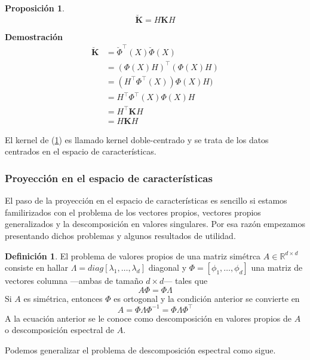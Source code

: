 \documentclass{article}
\numberwithin{equation}{section}
\newtheorem{proposition}{Proposición}
\theoremstyle{remark}
\theoremstyle{definition}
\newtheorem{definition}{Definición}
\theoremstyle{remark}
\theoremstyle{remark}
\begin{document}
\begin{proposition}
   \label{pp:double_centered_kernel}
   $$\breve{\bm{K}} = H \bm{K} H$$
\end{proposition}
\textbf{Demostración}
\begin{align*}
\breve{\bm{K}} &= \breve{\Phi}^\intercal(X) \breve{\Phi}(X) \\
        &= (\Phi(X)H)^\intercal (\Phi(X)H) \\
        &= (H^\intercal \Phi^\intercal(X))\Phi(X)H) \\
        &= H^\intercal \Phi^\intercal(X)\Phi(X)H \\
        &= H^\intercal \bm{K} H \\
        &= H \bm{K} H
\end{align*}

El kernel de (\ref{pp:double_centered_kernel}) es llamado kernel doble-centrado y se trata
de los datos centrados en el espacio de características.

\subsubsection{Proyección en el espacio de características}
El paso de la proyección en el espacio de características es sencillo si 
estamos familirizados con el problema de los vectores propios, vectores propios generalizados y 
la descomposición en valores singulares.
Por esa razón empezamos presentando dichos problemas y algunos resultados de utilidad.

\begin{definition}
    \label{df:eigenvalue_problem}
    El problema de valores propios de una matriz simétrca $A \in \mathbb{R}^{d \times d}$ consiste en hallar
    $\Lambda = diag[\lambda_1, \ldots, \lambda_d]$ diagonal y $\Phi = [\phi_1, \ldots, \phi_d]$ 
    una matriz de vectores columna ---ambas de tamaño $d \times d$--- tales que
    $$A \Phi = \Phi \Lambda$$
    Si $A$ es simétrica, entonces $\Phi$ es ortogonal y la condición anterior se convierte en
    \begin{equation}
    \label{eq:eigenvalue_problem}
    A = \Phi \Lambda \Phi^{-1} = \Phi \Lambda \Phi^\intercal
    \end{equation}
    A la ecuación anterior se le conoce como descomposición en valores propios de $A$ 
    o descomposición espectral de $A$.
\end{definition}

Podemos generalizar el problema de descomposición espectral como sigue.
\end{document}
